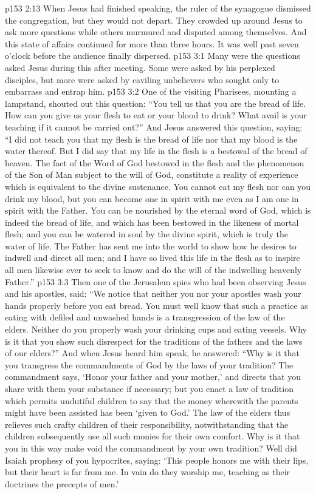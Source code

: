 \vs p153 2:13 When Jesus had finished speaking, the ruler of the synagogue dismissed the congregation, but they would not depart. They crowded up around Jesus to ask more questions while others murmured and disputed among themselves. And this state of affairs continued for more than three hours. It was well past seven o’clock before the audience finally dispersed.
\vs p153 3:1 Many were the questions asked Jesus during this after meeting. Some were asked by his perplexed disciples, but more were asked by caviling unbelievers who sought only to embarrass and entrap him.
\vs p153 3:2 One of the visiting Pharisees, mounting a lampstand, shouted out this question: “You tell us that you are the bread of life. How can you give us your flesh to eat or your blood to drink? What avail is your teaching if it cannot be carried out?” And Jesus answered this question, saying: \textcolor{ubdarkred}{“I did not teach you that my flesh is the bread of life nor that my blood is the water thereof. But I did say that my life in the flesh is a bestowal of the bread of heaven. The fact of the Word of God bestowed in the flesh and the phenomenon of the Son of Man subject to the will of God, constitute a reality of experience which is equivalent to the divine sustenance. You cannot eat my flesh nor can you drink my blood, but you can become one in spirit with me even as I am one in spirit with the Father. You can be nourished by the eternal word of God, which is indeed the bread of life, and which has been bestowed in the likeness of mortal flesh; and you can be watered in soul by the divine spirit, which is truly the water of life. The Father has sent me into the world to show how he desires to indwell and direct all men; and I have so lived this life in the flesh as to inspire all men likewise ever to seek to know and do the will of the indwelling heavenly Father.”}
\vs p153 3:3 Then one of the Jerusalem spies who had been observing Jesus and his apostles, said: “We notice that neither you nor your apostles wash your hands properly before you eat bread. You must well know that such a practice as eating with defiled and unwashed hands is a transgression of the law of the elders. Neither do you properly wash your drinking cups and eating vessels. Why is it that you show such disrespect for the traditions of the fathers and the laws of our elders?” And when Jesus heard him speak, he answered: \textcolor{ubdarkred}{“Why is it that you transgress the commandments of God by the laws of your tradition? The commandment says, ‘Honor your father and your mother,’ and directs that you share with them your substance if necessary; but you enact a law of tradition which permits undutiful children to say that the money wherewith the parents might have been assisted has been ‘given to God.’ The law of the elders thus relieves such crafty children of their responsibility, notwithstanding that the children subsequently use all such monies for their own comfort. Why is it that you in this way make void the commandment by your own tradition? Well did Isaiah prophesy of you hypocrites, saying: ‘This people honors me with their lips, but their heart is far from me. In vain do they worship me, teaching as their doctrines the precepts of men.’}
